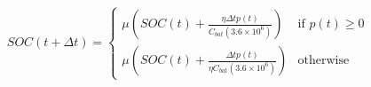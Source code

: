 \begin{equation}
	SOC(t+\Delta t) =
	\begin{cases}
		\mu \left(SOC(t) + \frac{\eta \Delta t p(t)}{C_{bat}(3.6\times10^6)}\right) &\text{if } p(t) \geq 0\\
		\mu \left(SOC(t) + \frac{\Delta t p(t)}{\eta C_{bat}(3.6\times10^6)}\right) &\text{otherwise}
	\end{cases}
	\label{ch2:equ:battery-model-equation}
\end{equation}